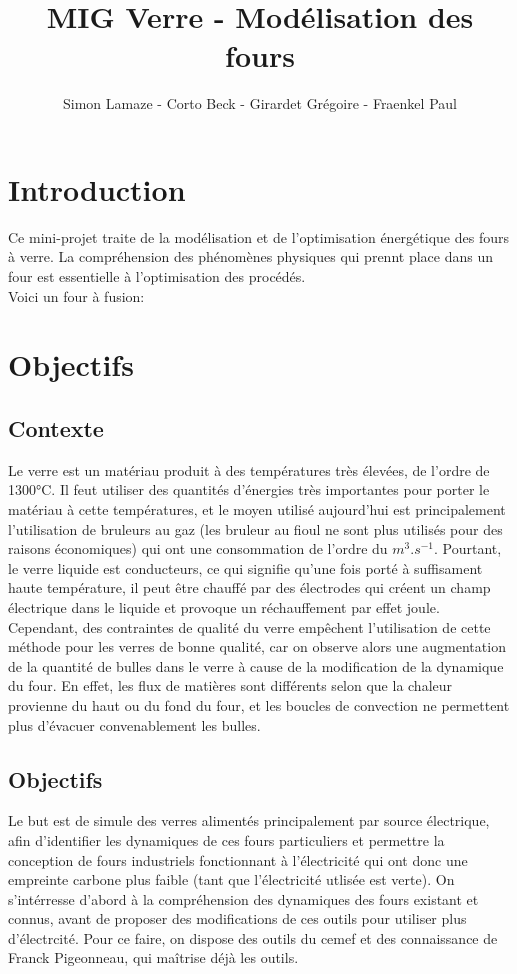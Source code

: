 \documentclass[12pt, a4paper, french, BCOR = 0pt, DIV = 10]{scrartcl}
\title{MIG Verre - Modélisation des fours}
\author{\small{Simon Lamaze - Corto Beck - Girardet Grégoire - Fraenkel Paul}}
\begin{document}
    
    \maketitle
    
    \section{Introduction}
    \raggedright
    Ce mini-projet traite de la modélisation et de l'optimisation énergétique des fours à verre.  La compréhension des phénomènes physiques qui prennt place dans un four est essentielle à l'optimisation des procédés. \\ [0.5 cm]
    Voici un four à fusion:
    

    \section{Objectifs}
    \subsection{Contexte}
    Le verre est un matériau produit à des températures très élevées, de l'ordre de 1300°C. Il feut utiliser des quantités d'énergies très importantes pour porter le matériau à cette températures, et le moyen utilisé aujourd'hui est principalement l'utilisation de bruleurs au gaz (les bruleur au fioul ne sont plus utilisés pour des raisons économiques) qui ont une consommation de l'ordre du $m^{3}.s^{-1}$. Pourtant, le verre liquide est conducteurs, ce qui signifie qu'une fois porté à suffisament haute température, il peut être chauffé par des électrodes qui créent un champ électrique dans le liquide et provoque un réchauffement par effet joule. Cependant, des contraintes de qualité du verre empêchent l'utilisation de cette méthode pour les verres de bonne qualité, car on observe alors une augmentation de la quantité de bulles dans le verre à cause de la modification de la dynamique du four. En effet, les flux de matières sont différents selon que la chaleur provienne du haut ou du fond du four, et les boucles de convection ne permettent plus d'évacuer convenablement les bulles.

    \subsection{Objectifs}
    Le but est de simule des verres alimentés principalement par source électrique, afin d'identifier les dynamiques de ces fours particuliers et permettre la conception de fours industriels fonctionnant à l'électricité qui ont donc une empreinte carbone plus faible (tant que l'électricité utlisée est verte). On s'intérresse d'abord à la compréhension des dynamiques des fours existant et connus, avant de proposer des modifications de ces outils pour utiliser plus d'électrcité. Pour ce faire, on dispose des outils du cemef et des connaissance de Franck Pigeonneau, qui maîtrise déjà les outils.
    
\end{document}
